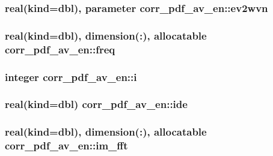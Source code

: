 \hypertarget{classcorr__pdf__av__en_a6837f559a03430c24e3fcfaeb3cfab6b}{
\subsubsection[{ev2wvn}]{\setlength{\rightskip}{0pt plus 5cm}real(kind={\bf dbl}), parameter corr\+\_\+pdf\+\_\+av\+\_\+en\+::ev2wvn}}\label{classcorr__pdf__av__en_a6837f559a03430c24e3fcfaeb3cfab6b}
\hypertarget{classcorr__pdf__av__en_a6bfe60f479474ca924c3d7a26a30725b}{
\subsubsection[{freq}]{\setlength{\rightskip}{0pt plus 5cm}real(kind={\bf dbl}), dimension(\+:), allocatable corr\+\_\+pdf\+\_\+av\+\_\+en\+::freq}}\label{classcorr__pdf__av__en_a6bfe60f479474ca924c3d7a26a30725b}
\hypertarget{classcorr__pdf__av__en_a6becc690d925f29e3c0cadb6ec351d46}{
\subsubsection[{i}]{\setlength{\rightskip}{0pt plus 5cm}integer corr\+\_\+pdf\+\_\+av\+\_\+en\+::i}}\label{classcorr__pdf__av__en_a6becc690d925f29e3c0cadb6ec351d46}
\hypertarget{classcorr__pdf__av__en_aa797ffdf9a23dd9d5bef056d40836afc}{
\subsubsection[{ide}]{\setlength{\rightskip}{0pt plus 5cm}real(kind={\bf dbl}) corr\+\_\+pdf\+\_\+av\+\_\+en\+::ide}}\label{classcorr__pdf__av__en_aa797ffdf9a23dd9d5bef056d40836afc}
\hypertarget{classcorr__pdf__av__en_aa146e151c4b487b62759edfe51a71d9b}{
\subsubsection[{im\+\_\+fft}]{\setlength{\rightskip}{0pt plus 5cm}real(kind={\bf dbl}), dimension(\+:), allocatable corr\+\_\+pdf\+\_\+av\+\_\+en\+::im\+\_\+fft}}\label{classcorr__pdf__av__en_aa146e151c4b487b62759edfe51a71d9b}
